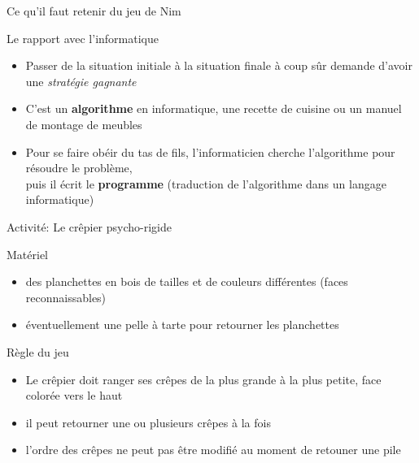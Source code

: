 \documentclass[final,hyperref={pdfpagelabels=false}]{beamer}
\begin{document}
\begin{frame}{Ce qu'il faut retenir du jeu de Nim}
  \begin{block}{Le rapport avec l'informatique}
    \begin{itemize}
    \item Passer de la situation initiale à la situation finale à coup sûr demande d'avoir
      une \textit{stratégie gagnante}
    \item C'est un \alert{\textbf{algorithme}} en informatique, une recette de
      cuisine ou un manuel de montage de meubles
    \item Pour se faire obéir du tas de fils, l'informaticien cherche
      l'algorithme pour résoudre le problème,\\
      puis il écrit le \alert{\textbf{programme}} (traduction de l'algorithme
      dans un langage informatique)
    \end{itemize}
  \end{block}
\end{frame}
\begin{frame}{Activité: Le crêpier psycho-rigide}
 
  \begin{block}{Matériel}
    \begin{itemize}
    \item des planchettes en bois de tailles et de couleurs différentes (faces reconnaissables)
    \item éventuellement une pelle à tarte pour retourner les planchettes
    \end{itemize}
  \end{block}
  
  \begin{block}{Règle du jeu}
    \begin{itemize}
    \item Le crêpier doit ranger ses crêpes de la plus grande à la plus petite,
      face colorée vers le haut
    \item il peut retourner une ou plusieurs crêpes à la fois
    \item l'ordre des crêpes ne peut pas être modifié au moment de retouner
      une pile
    \end{itemize}
  \end{block}


\end{frame}
\end{document}
